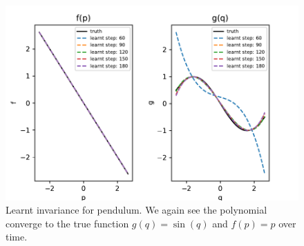 \documentclass{statsmsc}
\begin{document}
\begin{figure}[H] 
  \includegraphics[width=0.8\linewidth]{../codes/figures/pendulum_learnt_over_time.pdf}
  \centering
  \caption{Learnt invariance for pendulum. We again see the polynomial converge to the true function $g(q)=\sin(q)$ and $f(p)=p$ over time.}
  \label{fig:pendulum_learnt}
\end{figure}
\end{document}
